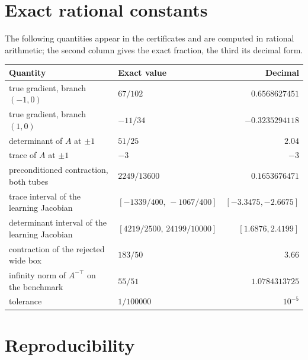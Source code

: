 \documentclass[11pt]{article}
\theoremstyle{definition}
\theoremstyle{remark}
\begin{document}
\section{Exact rational constants}\label{app:constants}

The following quantities appear in the certificates and are computed in rational arithmetic; the
second column gives the exact fraction, the third its decimal form.

\begin{center}
\small
\begin{tabular}{llr}
\toprule
Quantity & Exact value & Decimal \\
\midrule
true gradient, branch $(-1,0)$ & $67/102$ & $0.6568627451$ \\
true gradient, branch $(1,0)$ & $-11/34$ & $-0.3235294118$ \\
determinant of $A$ at $\pm1$ & $51/25$ & $2.04$ \\
trace of $A$ at $\pm1$ & $-3$ & $-3$ \\
preconditioned contraction, both tubes & $2249/13600$ & $0.1653676471$ \\
trace interval of the learning Jacobian & $[-1339/400,\,-1067/400]$ & $[-3.3475,-2.6675]$ \\
determinant interval of the learning Jacobian & $[4219/2500,\,24199/10000]$ & $[1.6876,2.4199]$ \\
contraction of the rejected wide box & $183/50$ & $3.66$ \\
infinity norm of $A^{-\top}$ on the benchmark & $55/51$ & $1.0784313725$ \\
tolerance & $1/100000$ & $10^{-5}$ \\
\bottomrule
\end{tabular}
\end{center}

\section{Reproducibility}\label{app:repro}
\end{document}
